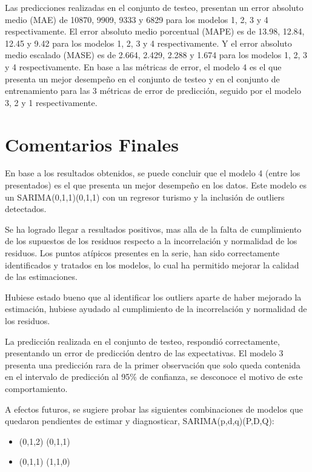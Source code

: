\documentclass[
  12pt,
]{article}
\providecommand{\tightlist}{%
  \setlength{\itemsep}{0pt}\setlength{\parskip}{0pt}}
\begin{document}
Las predicciones realizadas en el conjunto de testeo, presentan un error
absoluto medio (MAE) de 10870, 9909, 9333 y 6829 para los modelos 1, 2,
3 y 4 respectivamente. El error absoluto medio porcentual (MAPE) es de
13.98, 12.84, 12.45 y 9.42 para los modelos 1, 2, 3 y 4 respectivamente.
Y el error absoluto medio escalado (MASE) es de 2.664, 2.429, 2.288 y
1.674 para los modelos 1, 2, 3 y 4 respectivamente. En base a las
métricas de error, el modelo 4 es el que presenta un mejor desempeño en
el conjunto de testeo y en el conjunto de entrenamiento para las 3
métricas de error de predicción, seguido por el modelo 3, 2 y 1
respectivamente.

\hypertarget{comentarios}{%
\section{Comentarios Finales}\label{comentarios}}

En base a los resultados obtenidos, se puede concluir que el modelo 4
(entre los presentados) es el que presenta un mejor desempeño en los
datos. Este modelo es un SARIMA(0,1,1)(0,1,1) con un regresor turismo y
la inclusión de outliers detectados.

Se ha logrado llegar a resultados positivos, mas alla de la falta de
cumplimiento de los supuestos de los residuos respecto a la
incorrelación y normalidad de los residuos. Los puntos atípicos
presentes en la serie, han sido correctamente identificados y tratados
en los modelos, lo cual ha permitido mejorar la calidad de las
estimaciones.

Hubiese estado bueno que al identificar los outliers aparte de haber
mejorado la estimación, hubiese ayudado al cumplimiento de la
incorrelación y normalidad de los residuos.

La predicción realizada en el conjunto de testeo, respondió
correctamente, presentando un error de predicción dentro de las
expectativas. El modelo 3 presenta una predicción rara de la primer
observación que solo queda contenida en el intervalo de predicción al
95\% de confianza, se desconoce el motivo de este comportamiento.

A efectos futuros, se sugiere probar las siguientes combinaciones de
modelos que quedaron pendientes de estimar y diagnosticar,
SARIMA(p,d,q)(P,D,Q): 
  \begin{itemize}
  \tightlist
  \item
    (0,1,2) (0,1,1)
  \item
    (0,1,1) (1,1,0)
  \end{itemize}
\end{document}
